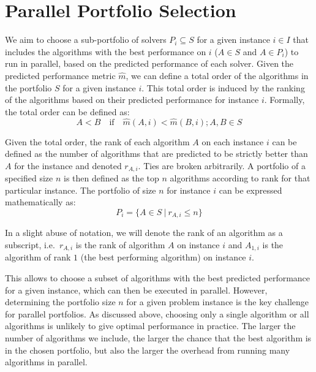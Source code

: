\section{Parallel Portfolio Selection}

We aim to choose a sub-portfolio of solvers \begin{math} P_i \subseteq S \end{math} for a given instance $i \in I$ that includes the algorithms with the best performance on $i$ (\begin{math} A \in S \end{math} and \begin{math} A \in P_i \end{math}) to run in parallel, based on the predicted performance of each solver. Given the predicted performance metric $\hat{m}$, we can define a total order of the algorithms in the portfolio $S$ for a given instance $i$. This total order is induced by the ranking of the algorithms based on their predicted performance for instance $i$. Formally, the total order can be defined as:
\begin{equation}\label{eq:3}
A < B \quad \text{if} \quad \hat{m}(A,i) < \hat{m}(B,i); A,B \in S
\end{equation}

Given the total order, the rank of each algorithm $A$ on each instance $i$ can be defined as the number of algorithms that are predicted to be strictly better than $A$ for the instance and denoted $r_{A,i}$. Ties are broken arbitrarily. A portfolio of a specified size $n$ is then defined as the top $n$ algorithms according to rank for that particular instance. The portfolio of size $n$ for instance $i$ can be expressed mathematically as:
\begin{equation}\label{eq:4}
P_i = \{A \in S \: | \: r_{A,i} \leq n\}
\end{equation}

In a slight abuse of notation, we will denote the rank of an algorithm as a subscript, i.e.\ $r_{A,i}$ is the rank of algorithm $A$ on instance $i$ and $A_{1,i}$ is the algorithm of rank $1$ (the best performing algorithm) on instance $i$.

This allows to choose a subset of algorithms with the best predicted performance for a given instance, which can then be executed in parallel. However, determining the portfolio size $n$ for a given problem instance is the key challenge for parallel portfolios. As discussed above, choosing only a single algorithm or all algorithms is unlikely to give optimal performance in practice. The larger the number of algorithms we include, the larger the chance that the best algorithm is in the chosen portfolio, but also the larger the overhead from running many algorithms in parallel. 

